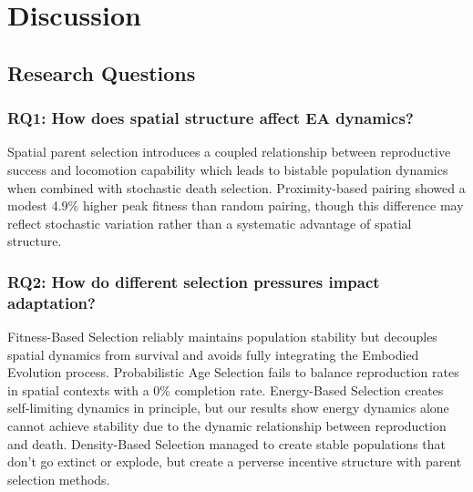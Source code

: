 \documentclass[dvipsnames,format=sigconf,anonymous=false,review=false]{acmart}
\begin{document}


\section{Discussion}

\subsection{Research Questions}

\subsubsection*{RQ1: How does spatial structure affect EA dynamics?}

Spatial parent selection introduces a coupled relationship between reproductive success and locomotion capability which leads to bistable population dynamics when combined with stochastic death selection. Proximity-based pairing showed a modest 4.9\% higher peak fitness than random pairing, though this difference may reflect stochastic variation rather than a systematic advantage of spatial structure.

\subsubsection*{RQ2: How do different selection pressures impact adaptation?}

Fitness-Based Selection reliably maintains population stability but decouples spatial dynamics from survival and avoids fully integrating the Embodied Evolution process. Probabilistic Age Selection fails to balance reproduction rates in spatial contexts with a 0\% completion rate. Energy-Based Selection creates self-limiting dynamics in principle, but our results show energy dynamics alone cannot achieve stability due to the dynamic relationship between reproduction and death. Density-Based Selection managed to create stable populations that don't go extinct or explode, but create a perverse incentive structure with parent selection methods.
\end{document}
